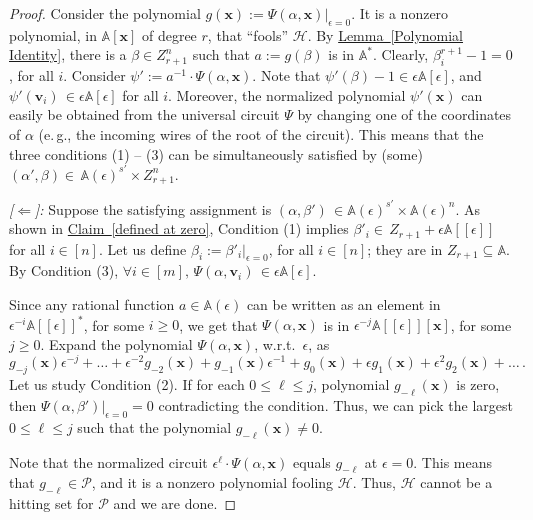 \documentclass[11pt]{article}
\numberwithin{equation}{section}
\theoremstyle{definition}
\theoremstyle{plain}
\newcommand{\eg}{e.\,g.}
\newcommand{\expref}[2]{\hyperref[#2]{#1~\ref{#2}}}
\newcommand{\calH}{\mathcal{H}}
\newcommand{\calP}{\mathcal{P}}
\newcommand{\aff}{\mathbb{A}}
\begin{document}
\begin{proof}
Consider the polynomial $g(\mathbf x):= \Psi(\alpha, \mathbf x)\big\vert_{\epsilon=0}$. It is a nonzero polynomial, in $\aff[\mathbf x]$ of 
%
degree $r$, %
that ``fools'' $\calH$. By 
%
\expref{Lemma}{Polynomial Identity}, %
there is a $\beta\in Z_{r+1}^n$ such that $a:= g(\beta)$ is in $\aff^*$. Clearly, $\beta_i^{r+1} - 1 = 0$, for all $i$. Consider $\psi':= a^{-1}\cdot\Psi(\alpha, \mathbf x)$. Note that $\psi'(\beta)-1 \in \epsilon\aff[\epsilon]$, and $\psi'(\mathbf{v}_i) \,\in \epsilon\aff[\epsilon]$ for all $i$. Moreover, the normalized polynomial $\psi'(\mathbf x)$ can easily be obtained from the universal circuit $\Psi$ by changing one of the coordinates of $\alpha$ (\eg, the incoming wires of the root of the circuit). This means that the three conditions 
%
(1) -- (3) %
can be simultaneously satisfied by (some) $(\alpha',\beta)\in\, \aff(\epsilon)^{s'}\times Z_{r+1}^n$.

\smallskip\emph{[$\Leftarrow$]:}
Suppose the satisfying assignment is $(\alpha, \beta')\,\in \aff(\epsilon)^{s'}\times \aff(\epsilon)^{n}$. As shown in \expref{Claim}{defined at zero}, 
%
Condition (1) implies %
$\beta'_i\in \, Z_{r+1} + \epsilon\aff[[\epsilon]]$ for all $i\in[n]$. Let us define $\beta_i:= \beta'_i\big\vert_{\epsilon=0}$, for all $i\in[n]$; they are in $Z_{r+1}\subseteq\aff$. 
%
By Condition (3), %
$\forall i \in [m],\, \Psi(\alpha,\mathbf{v}_i) \,\in \epsilon\aff[\epsilon]$.

Since any rational function $a\in \aff(\epsilon)$ can be written as an element in $\epsilon^{-i}\aff[[\epsilon]]^*$, for some $i\ge0$, we get that $\Psi(\alpha,\mathbf x)$ is in 
$\epsilon^{-j}\aff[[\epsilon]][\mathbf x]$, for some $j\ge0$.
Expand the polynomial $\Psi(\alpha,\mathbf x)$, w.r.t.\ $\epsilon$, 
%
as %
$$g_{-j}(\mathbf x)\epsilon^{-j} + \dots + \epsilon^{-2} g_{-2}(\mathbf x) + g_{-1}(\mathbf x)\epsilon^{-1} + g_0(\mathbf x) + \epsilon g_1(\mathbf x) + \epsilon^2 g_2(\mathbf x) + \dots \,.$$
%
Let us study Condition (2). If for each $0\le\ell\le j$, polynomial $g_{-\ell}(\mathbf x)$ is zero, then $\Psi(\alpha,\beta')\big\vert_{\epsilon=0} =0$ contradicting the condition. Thus, we can pick the largest $0\le\ell\le j$ such that the polynomial $g_{-\ell}(\mathbf x)\ne0$. %
%

Note that the normalized circuit $\epsilon^\ell\cdot \Psi(\alpha,\mathbf x)$ equals $g_{-\ell}$ at $\epsilon=0$. This means that $g_{-\ell}\in\calP$, and it is a nonzero polynomial fooling $\calH$. Thus, $\calH$ cannot be a hitting set for $\calP$ and we are done.
\end{proof}
\end{document}
